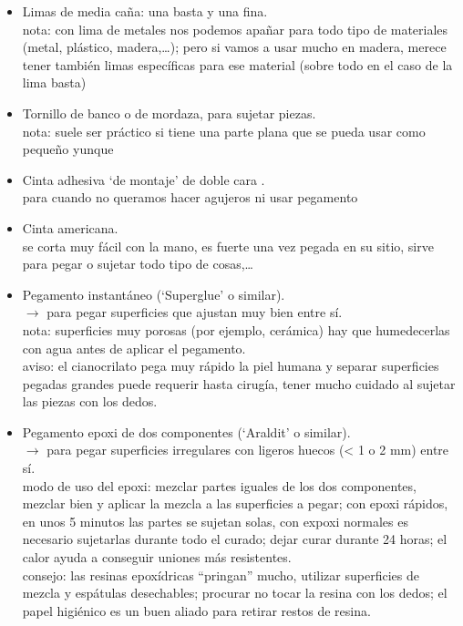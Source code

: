 \documentclass[spanish,10pt,a4paper,final,oneside]{article}
\begin{document}
\begin{itemize}
\item Limas de media caña: una basta y una fina.
\\nota: con lima de metales nos podemos apañar para todo tipo de materiales (metal, plástico, madera,\ldots); pero si vamos a usar mucho en madera, merece tener también limas específicas para ese material (sobre todo en el caso de la lima basta)

\item Tornillo de banco o de mordaza, para sujetar piezas.
\\nota: suele ser práctico si tiene una parte plana que se pueda usar como pequeño yunque

\item Cinta adhesiva `de montaje' de doble cara .
\\ para cuando no queramos hacer agujeros ni usar pegamento

\item Cinta americana.
\\ se corta muy fácil con la mano, es fuerte una vez pegada en su sitio, sirve para pegar o sujetar todo tipo de cosas,\ldots

\item Pegamento instantáneo (`Superglue' o similar).
\\$\rightarrow$ para pegar superficies que ajustan muy bien entre sí.
\\nota: superficies muy porosas (por ejemplo, cerámica) hay que humedecerlas con agua antes de aplicar el pegamento.
\\aviso: el cianocrilato pega muy rápido la piel humana y separar superficies pegadas grandes puede requerir hasta cirugía, tener mucho cuidado al sujetar las piezas con los dedos.

\item Pegamento epoxi de dos componentes (`Araldit' o similar).
\\$\rightarrow$ para pegar superficies irregulares con ligeros huecos (< 1 o 2 mm) entre sí.
\\modo de uso del epoxi: mezclar partes iguales de los dos componentes, mezclar bien y aplicar la mezcla a las superficies a pegar; con epoxi rápidos, en unos 5 minutos las partes se sujetan solas, con expoxi normales es necesario sujetarlas durante todo el curado; dejar curar durante 24 horas; el calor ayuda a conseguir uniones más resistentes.
\\consejo: las resinas epoxídricas ``pringan'' mucho, utilizar superficies de mezcla y espátulas desechables; procurar no tocar la resina con los dedos; el papel higiénico es un buen aliado para retirar restos de resina.


\end{itemize}
\end{document}
